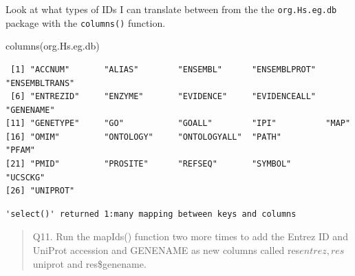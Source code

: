 \documentclass[
  letterpaper,
  DIV=11,
  numbers=noendperiod]{scrartcl}
\newenvironment{Shaded}{\begin{snugshade}}{\end{snugshade}}
\newcommand{\AttributeTok}[1]{\textcolor[rgb]{0.40,0.45,0.13}{#1}}
\newcommand{\FunctionTok}[1]{\textcolor[rgb]{0.28,0.35,0.67}{#1}}
\newcommand{\NormalTok}[1]{\textcolor[rgb]{0.00,0.23,0.31}{#1}}
\newcommand{\OtherTok}[1]{\textcolor[rgb]{0.00,0.23,0.31}{#1}}
\newcommand{\SpecialCharTok}[1]{\textcolor[rgb]{0.37,0.37,0.37}{#1}}
\newcommand{\StringTok}[1]{\textcolor[rgb]{0.13,0.47,0.30}{#1}}
\begin{document}
\begin{verbatim}
\end{verbatim}

Look at what types of IDs I can translate between from the the
\texttt{org.Hs.eg.db} package with the \texttt{columns()} function.

\begin{Shaded}
\begin{Highlighting}[]
\FunctionTok{columns}\NormalTok{(org.Hs.eg.db)}
\end{Highlighting}
\end{Shaded}

\begin{verbatim}
 [1] "ACCNUM"       "ALIAS"        "ENSEMBL"      "ENSEMBLPROT"  "ENSEMBLTRANS"
 [6] "ENTREZID"     "ENZYME"       "EVIDENCE"     "EVIDENCEALL"  "GENENAME"    
[11] "GENETYPE"     "GO"           "GOALL"        "IPI"          "MAP"         
[16] "OMIM"         "ONTOLOGY"     "ONTOLOGYALL"  "PATH"         "PFAM"        
[21] "PMID"         "PROSITE"      "REFSEQ"       "SYMBOL"       "UCSCKG"      
[26] "UNIPROT"     
\end{verbatim}

\begin{Shaded}
\end{Shaded}

\begin{verbatim}
'select()' returned 1:many mapping between keys and columns
\end{verbatim}

\begin{quote}
Q11. Run the mapIds() function two more times to add the Entrez ID and
UniProt accession and GENENAME as new columns called
res\(entrez, res\)uniprot and res\$genename.
\end{quote}

\begin{Shaded}
\end{Shaded}
\end{document}
